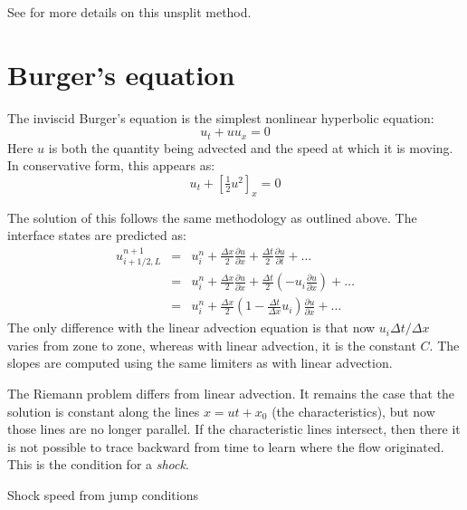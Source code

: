 \documentclass[11pt]{article}
\begin{document}
See \cite{colella:1990} for more details on this unsplit method.


\section{Burger's equation}

The inviscid Burger's equation is the simplest nonlinear hyperbolic
equation:
\begin{equation}
u_t + u u_x = 0
\end{equation}
Here $u$ is both the quantity being advected and the speed at which 
it is moving.
In conservative form, this appears as:
\begin{equation}
u_t + \left [\tfrac{1}{2} u^2 \right ]_x = 0
\end{equation}

The solution of this follows the same methodology as outlined above.
The interface states are predicted as:
\begin{eqnarray}
u^{n+1}_{i+1/2,L} &=& u^n_i + \frac{\Delta x}{2} \frac{\partial u}{\partial x}
                        + \frac{\Delta t}{2} \frac{\partial u}{\partial t} + \ldots \\
                &=& u^n_i + \frac{\Delta x}{2} \frac{\partial u}{\partial x}
                        + \frac{\Delta t}{2} \left (-u_i \frac{\partial u}{\partial x} \right ) + \ldots \\
                &=& u^n_i + \frac{\Delta x}{2} \left ( 1 - \frac{\Delta t}{\Delta x}u_i \right ) \frac{\partial u}{\partial x} + \ldots
\end{eqnarray}
The only difference with the linear advection equation is that now
$u_i \Delta t/\Delta x$ varies from zone to zone, whereas with linear
advection, it is the constant $C$.  The slopes are computed using
the same limiters as with linear advection.

The Riemann problem differs from linear advection.  It remains the
case that the solution is constant along the lines $x = ut + x_0$ (the
characteristics), but now those lines are no longer parallel.  If the
characteristic lines intersect, then there it is not possible to trace
backward from time to learn where the flow originated.  This is the 
condition for a {\em shock}.

Shock speed from jump conditions
\end{document}
